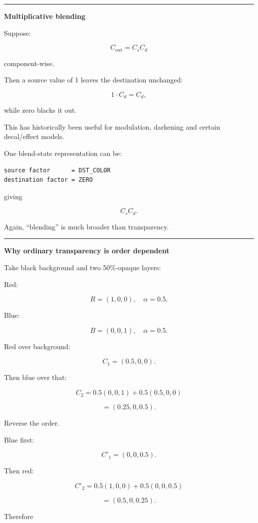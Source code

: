 \begin{center}\rule{0.5\linewidth}{0.5pt}\end{center}

\textbf{Multiplicative blending}

Suppose:

\[
C_{\text{out}}=C_sC_d
\]

component-wise.

Then a source value of 1 leaves the destination unchanged:

\[
1\cdot C_d=C_d,
\]

while zero blacks it out.

This has historically been useful for modulation, darkening and certain decal/effect models.

One blend-state representation can be:

\begin{verbatim}
source factor      = DST_COLOR
destination factor = ZERO
\end{verbatim}

giving

\[
C_sC_d.
\]

Again, ``blending'' is much broader than transparency.

\begin{center}\rule{0.5\linewidth}{0.5pt}\end{center}

\textbf{Why ordinary transparency is order dependent}

Take black background and two 50\%-opaque layers:

Red:

\[
R=(1,0,0),\quad \alpha=0.5.
\]

Blue:

\[
B=(0,0,1),\quad \alpha=0.5.
\]

Red over background:

\[
C_1=(0.5,0,0).
\]

Then blue over that:

\[
C_2
=
0.5(0,0,1)+0.5(0.5,0,0)
\]

\[
=
(0.25,0,0.5).
\]

Reverse the order.

Blue first:

\[
C'_1=(0,0,0.5).
\]

Then red:

\[
C'_2
=
0.5(1,0,0)+0.5(0,0,0.5)
\]

\[
=
(0.5,0,0.25).
\]

Therefore

